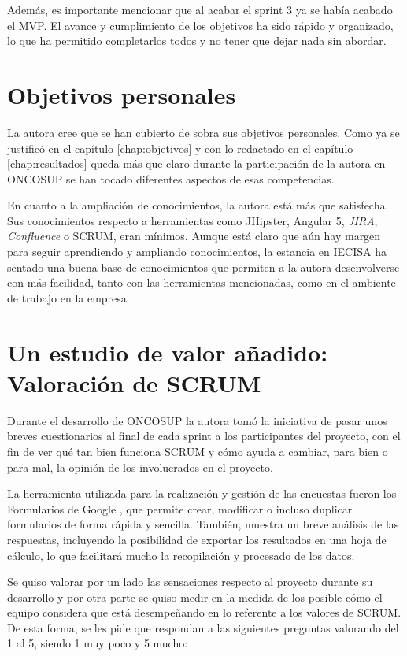 Además, es importante mencionar que al acabar el sprint 3 ya se había acabado el MVP. El avance y cumplimiento de los objetivos ha sido rápido y organizado, lo que ha permitido completarlos todos y no tener que dejar nada sin abordar.


\section{Objetivos personales}
\label{sec:ObjeticosPersonalesConsulsion}

La autora cree que se han cubierto de sobra sus objetivos personales. Como ya se justificó en el capítulo \ref{chap:objetivos} y con lo redactado en el capítulo \ref{chap:resultados} queda más que claro durante la participación de la autora en ONCOSUP se han tocado diferentes aspectos de esas competencias.

En cuanto a la ampliación de conocimientos, la autora está más que satisfecha. Sus conocimientos respecto a herramientas como JHipster, Angular 5, \emph{JIRA}, \emph{Confluence} o SCRUM, eran mínimos. Aunque está claro que aún hay margen para seguir aprendiendo y ampliando conocimientos, la estancia en IECISA ha sentado una buena base de conocimientos que permiten a la autora desenvolverse con más facilidad, tanto con las herramientas mencionadas, como en el ambiente de trabajo en la empresa.

\section{Un estudio de valor añadido: Valoración de SCRUM}
\label{sec:valorAñadido}


Durante el desarrollo de ONCOSUP la autora tomó la iniciativa de pasar unos breves cuestionarios al final de cada sprint a los participantes del proyecto, con el fin de ver qué tan bien funciona SCRUM y cómo ayuda a cambiar, para bien o para mal, la opinión de los involucrados en el proyecto.

La herramienta utilizada  para la realización y gestión de las encuestas fueron los Formularios de Google \cite{forms}, que permite crear, modificar o incluso duplicar formularios de forma rápida y sencilla. También, muestra un breve análisis de las respuestas, incluyendo la posibilidad de exportar los resultados en una hoja de cálculo, lo que facilitará mucho la recopilación y procesado de los datos.

Se quiso valorar por un lado las sensaciones respecto al proyecto durante su desarrollo y por otra parte se quiso medir en la medida de los posible cómo el equipo considera que está desempeñando en lo referente a los valores de SCRUM. De esta forma, se les pide que respondan a las siguientes preguntas valorando del 1 al 5, siendo 1 muy poco y 5 mucho:

